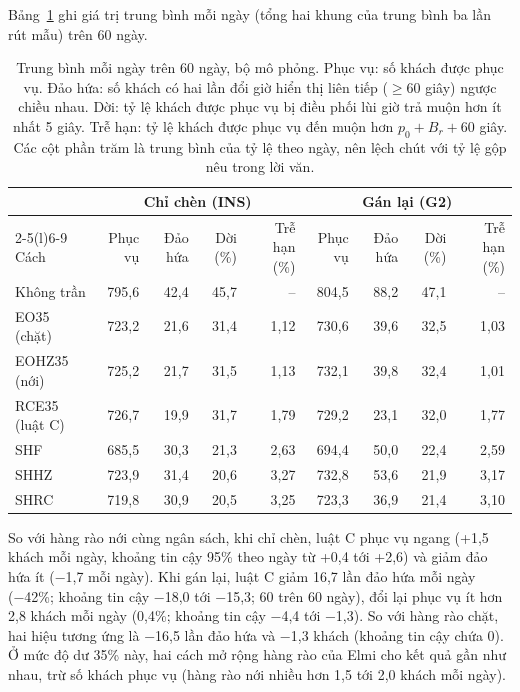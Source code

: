 Bảng~\ref{bang:c4-via} ghi giá trị trung bình mỗi ngày (tổng hai khung của trung bình ba lần rút mẫu) trên 60 ngày.

\begin{table}[htbp]
\centering
\caption[So sánh với Elmi Ordinary trên dữ liệu Via (bộ mô phỏng)]{Trung bình mỗi ngày trên 60 ngày, bộ mô phỏng.
Phục vụ: số khách được phục vụ. Đảo hứa: số khách có hai lần đổi giờ hiển thị liên tiếp ($\ge 60$ giây) ngược chiều nhau.
Dời: tỷ lệ khách được phục vụ bị điều phối lùi giờ trả muộn hơn ít nhất 5 giây. Trễ hạn: tỷ lệ khách được phục vụ đến muộn
hơn $p_0 + B_r + 60$ giây. Các cột phần trăm là trung bình của tỷ lệ theo ngày, nên lệch chút với tỷ lệ gộp nêu trong
lời văn.}
\label{bang:c4-via}
\footnotesize
\setlength{\tabcolsep}{3.2pt}
\begin{tabular}{@{}lrrrrrrrr@{}}
\toprule
& \multicolumn{4}{c}{Chỉ chèn (INS)} & \multicolumn{4}{c}{Gán lại (G2)}\\
\cmidrule(lr){2-5}\cmidrule(l){6-9}
Cách & Phục vụ & Đảo hứa & Dời (\%) & Trễ hạn (\%) & Phục vụ & Đảo hứa & Dời (\%) & Trễ hạn (\%)\\
\midrule
Không trần & 795,6 & 42,4 & 45,7 & -- & 804,5 & 88,2 & 47,1 & --\\
EO35 (chặt) & 723,2 & 21,6 & 31,4 & 1,12 & 730,6 & 39,6 & 32,5 & 1,03\\
EOHZ35 (nới) & 725,2 & 21,7 & 31,5 & 1,13 & 732,1 & 39,8 & 32,4 & 1,01\\
RCE35 (luật C) & 726,7 & 19,9 & 31,7 & 1,79 & 729,2 & 23,1 & 32,0 & 1,77\\
\midrule
SHF & 685,5 & 30,3 & 21,3 & 2,63 & 694,4 & 50,0 & 22,4 & 2,59\\
SHHZ & 723,9 & 31,4 & 20,6 & 3,27 & 732,8 & 53,6 & 21,9 & 3,17\\
SHRC & 719,8 & 30,9 & 20,5 & 3,25 & 723,3 & 36,9 & 21,4 & 3,10\\
\bottomrule
\end{tabular}
\end{table}

So với hàng rào nới cùng ngân sách, khi chỉ chèn, luật C phục vụ ngang (+1,5 khách mỗi ngày, khoảng tin cậy 95\% theo
ngày từ +0,4 tới +2,6) và giảm đảo hứa ít (−1,7 mỗi ngày). Khi gán lại, luật C giảm 16,7 lần đảo hứa mỗi ngày (−42\%;
khoảng tin cậy −18,0 tới −15,3; 60 trên 60 ngày), đổi lại phục vụ ít hơn 2,8 khách mỗi ngày (0,4\%; khoảng tin cậy −4,4
tới −1,3). So với hàng rào chặt, hai hiệu tương ứng là −16,5 lần đảo hứa và −1,3 khách (khoảng tin cậy chứa 0). Ở mức độ
dư 35\% này, hai cách mở rộng hàng rào của Elmi cho kết quả gần như nhau, trừ số khách phục vụ (hàng rào nới nhiều hơn 1,5
tới 2,0 khách mỗi ngày).

